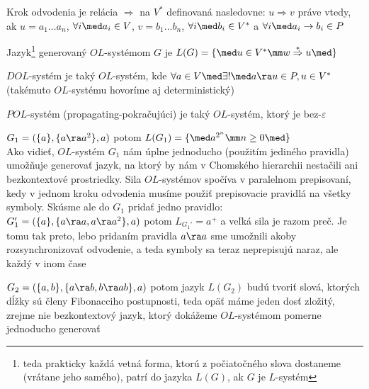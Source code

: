 \begin{definicia}
Krok odvodenia je relácia $\Rightarrow$ na $V^{*}$ definovaná
nasledovne: $u\Rightarrow v$ práve vtedy, ak $u=a_{1}\dots a_{n}$,
$\forall i\med a_{i}\in V$, $v=b_{1}\dots b_{n}$, $\forall i\med
b_{i}\in V^{*}$ a $\forall i\med a_{i}\rightarrow b_{i}\in P$
\end{definicia}

\begin{definicia}
Jazyk\footnote{teda prakticky každá vetná forma, ktorú z
počiatočného slova dostaneme (vrátane jeho samého), patrí do
jazyka $L(G)$, ak $G$ je $L$-systém} generovaný $OL$-systémom $G$
je $L(G)=\{\med u\in V^{*}\mm w\overset{*}\Rightarrow u\med\}$
\end{definicia}

\begin{definicia}
$DOL$-systém je taký $OL$-systém, kde $\forall a\in V\med\exists!
\med a\ra u\in P, u\in V^*$ (takémuto \mbox{$OL$-sys\-té\-mu}
hovoríme aj deterministický)
\end{definicia}

\begin{definicia}
$POL$-systém (propagating-pokračujúci) je taký $OL$-systém, ktorý
je bez-$\varepsilon$
\end{definicia}

\begin{priklad}
$G_{1}=(\{ a\},\{ a\ra a^{2}\},a)$ potom $L(G_{1})=\{\med
a^{2^{n}}\mm n\geq 0\med\}$\\ Ako vidieť, $OL$-systém $G_{1}$ nám
úplne jednoducho (použitím jediného pravidla) umožňuje
ge\-ne\-ro\-vať jazyk, na ktorý by nám v Chomského hierarchii
nestačili ani bezkontextové prostriedky. Sila $OL$-systémov
spočíva v paralelnom prepisovaní, kedy v jednom kroku odvodenia
musíme použiť prepisovacie pravidlá na všetky symboly. Skúsme ale
do $G_{1}$ pridať jedno pravidlo:\\ $G_{1}'=(\{ a\},\{ a\ra a,
a\ra a^{2}\},a)$ potom $L_{G_{1}'}=a^{+}$ a veľká sila je razom
preč. Je tomu tak preto, lebo pridaním pravidla $a\ra a$ sme
umožnili akoby rozsynchronizovať odvodenie, a teda symboly sa
teraz neprepisujú naraz, ale každý v inom čase
\end{priklad}

\begin{priklad}
$G_{2}=(\{a,b\},\{a\ra b,b\ra ab\},a)$ potom jazyk $L(G_{2})$ budú
tvoriť slová, ktorých dĺžky sú členy Fibonacciho postupnosti, teda
opäť máme jeden dosť zložitý, zrejme nie bezkontextový jazyk,
ktorý dokážeme $OL$-systémom pomerne jednoducho generovať
\end{priklad}

